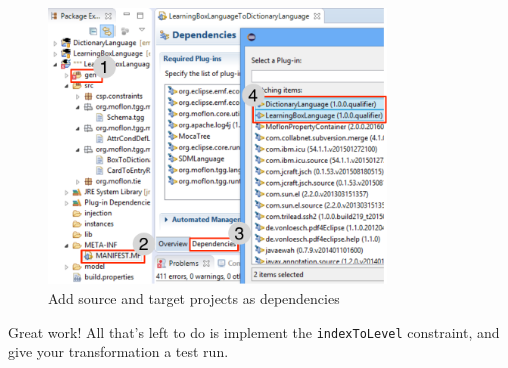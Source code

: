 \begin{figure}[htb]
\begin{center}
  \includegraphics[width=0.8\textwidth]{../../org.moflon.doc.handbook.04_tripleGraphTransformations/4_rules/eclipse_generatedTGG.pdf}
  \caption{Add source and target projects as dependencies}
  \label{eclipse:tggGenerated}
\end{center}
\end{figure}

Great work! All that's left to do is implement the \texttt{indexToLevel} constraint, and give your transformation a test run.

